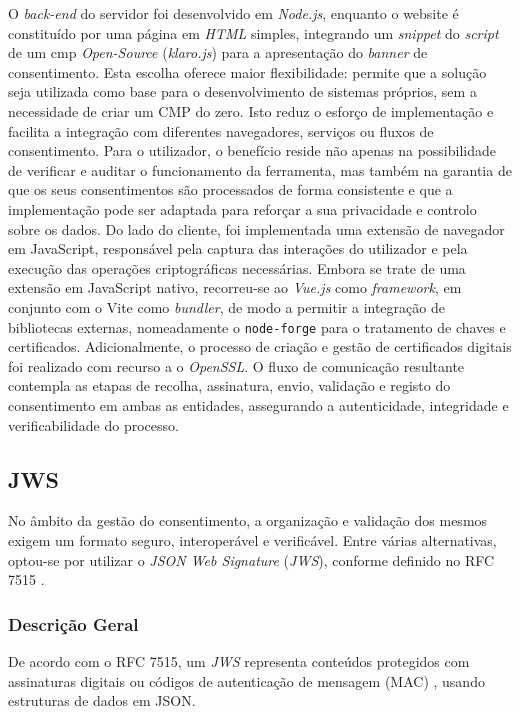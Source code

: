O \textit{back-end} do servidor foi desenvolvido em \textit{Node.js}, enquanto o website é constituído por uma página em \textit{HTML} simples, integrando um \textit{snippet} do \textit{script} de um \acrshort{cmp} \textit{Open-Source} (\textit{klaro.js}) para a apresentação do \textit{banner} de consentimento.
Esta escolha oferece maior flexibilidade: permite que a solução seja utilizada como base para o desenvolvimento de sistemas próprios, sem a necessidade de criar um CMP do zero. Isto reduz o esforço de implementação e facilita a integração com diferentes navegadores, serviços ou fluxos de consentimento. Para o utilizador, o benefício reside não apenas na possibilidade de verificar e auditar o funcionamento da ferramenta, mas também na garantia de que os seus consentimentos são processados de forma consistente e que a implementação pode ser adaptada para reforçar a sua privacidade e controlo sobre os dados.
Do lado do cliente, foi implementada uma extensão de navegador em JavaScript, responsável pela captura das interações do utilizador e pela execução das operações criptográficas necessárias. Embora se trate de uma extensão em JavaScript nativo, recorreu-se ao \textit{Vue.js} como \textit{framework}, em conjunto com o Vite como \textit{bundler}, de modo a permitir a integração de bibliotecas externas, nomeadamente o \texttt{node-forge} para o tratamento de chaves e certificados. Adicionalmente, o processo de criação e gestão de certificados digitais foi realizado com recurso a o \textit{OpenSSL}. O fluxo de comunicação resultante contempla as etapas de recolha, assinatura, envio, validação e registo do consentimento em ambas as entidades, assegurando a autenticidade, integridade e verificabilidade do processo.

\subsection{JWS}

No âmbito da gestão do consentimento, a organização e validação dos mesmos exigem um formato seguro, interoperável e verificável. Entre várias alternativas, optou-se por utilizar o \textit{JSON Web Signature} (\textit{JWS}), conforme definido no RFC 7515 \citep{rfc7515}.

\subsubsection{Descrição Geral}

De acordo com o RFC 7515, um \textit{JWS} representa conteúdos protegidos com assinaturas digitais ou códigos de autenticação de mensagem (MAC) \citep{NISTMAC}, usando estruturas de dados em JSON.

